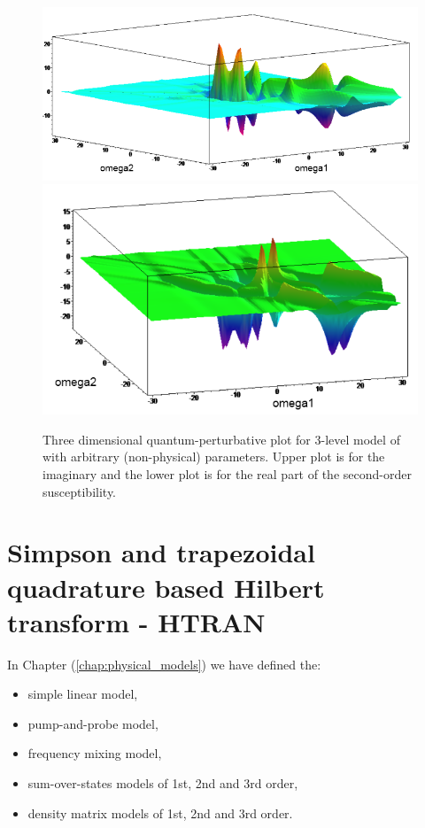 \documentclass[12pt,twoside,a4paper]{article}
\numberwithin{equation}{subsection}
\numberwithin{figure}{subsection}
\begin{document}
\begin{figure} 
  \includegraphics[width=150mm]{img/qp_3da.png} \\
  \includegraphics[width=150mm]{img/qp_3db.png}
  \caption{Three dimensional quantum-perturbative plot for 3-level model of with arbitrary (non-physical) parameters. Upper plot is for the imaginary and the lower plot is for the real part of the second-order susceptibility.
  \label{fig:qp_3d}}
\end{figure}
   
\section{Simpson and trapezoidal quadrature based Hilbert transform - HTRAN} \label{chap:htran}

In Chapter (\ref{chap:physical_models}) we have defined the:

\begin{itemize}
 \item simple linear model, 
 \item pump-and-probe model, 
 \item frequency mixing model, 
 \item sum-over-states models of 1st, 2nd and 3rd order,
 \item density matrix models of 1st, 2nd and 3rd order.
\end{itemize}
\end{document}
